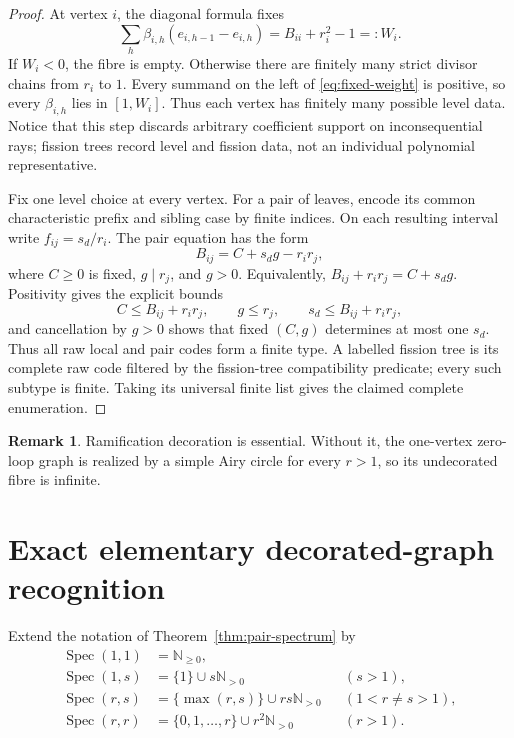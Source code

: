\documentclass[11pt,a4paper]{amsart}
\theoremstyle{plain}
\theoremstyle{definition}
\newtheorem{remark}[theorem]{Remark}
\newcommand{\NN}{\mathbb N}
\newcommand{\Spec}{\operatorname{Spec}}
\begin{document}
\begin{proof}
At vertex $i$, the diagonal formula fixes
\begin{equation}\label{eq:fixed-weight}
 \sum_h\beta_{i,h}(e_{i,h-1}-e_{i,h})=B_{ii}+r_i^2-1=:W_i.
\end{equation}
If $W_i<0$, the fibre is empty.  Otherwise there are finitely many strict divisor chains from
$r_i$ to $1$.  Every summand on the left of \eqref{eq:fixed-weight} is positive, so every
$\beta_{i,h}$ lies in $[1,W_i]$.  Thus each vertex has finitely many possible level data.  Notice
that this step discards arbitrary coefficient support on inconsequential rays; fission trees record
level and fission data, not an individual polynomial representative.

Fix one level choice at every vertex.  For a pair of leaves, encode its common characteristic
prefix and sibling case by finite indices.  On each resulting interval write
$f_{ij}=s_d/r_i$.  The pair equation has the form
\[
  B_{ij}=C+s_dg-r_ir_j,
\]
where $C\ge0$ is fixed, $g\mid r_j$, and $g>0$.  Equivalently,
$B_{ij}+r_ir_j=C+s_dg$.  Positivity gives the explicit bounds
\[
 C\le B_{ij}+r_ir_j,\qquad g\le r_j,\qquad s_d\le B_{ij}+r_ir_j,
\]
and cancellation by $g>0$ shows that fixed $(C,g)$ determines at most one $s_d$.  Thus all raw
local and pair codes form a finite type.  A labelled fission tree is its complete raw code filtered
by the fission-tree compatibility predicate; every such subtype is finite.  Taking its universal
finite list gives the claimed complete enumeration.
\end{proof}

\begin{remark}
Ramification decoration is essential.  Without it, the one-vertex zero-loop graph is realized by a
simple Airy circle for every $r>1$, so its undecorated fibre is infinite.
\end{remark}

\section{Exact elementary decorated-graph recognition}\label{sec:recognition}

Extend the notation of Theorem~\ref{thm:pair-spectrum} by
\begin{equation}\label{eq:spec-all}
\begin{aligned}
 \Spec(1,1)&=\NN_{\ge0},\\
 \Spec(1,s)&=\{1\}\cup s\NN_{>0} &&(s>1),\\
 \Spec(r,s)&=\{\max(r,s)\}\cup rs\NN_{>0} &&(1<r\ne s>1),\\
 \Spec(r,r)&=\{0,1,\ldots,r\}\cup r^2\NN_{>0} &&(r>1).
\end{aligned}
\end{equation}
\end{document}
